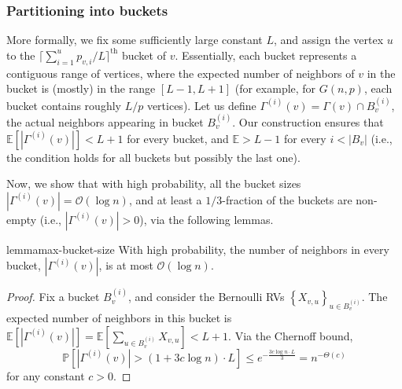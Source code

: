 \subsubsection{Partitioning into buckets}
\label{sec:bucket_partition}
More formally, we fix some sufficiently large constant $L$,
and assign the vertex $u$ to the $\lceil\sum^{u}_{i=1} p_{v,i}/L\rceil^\textrm{th}$ bucket of $v$.
Essentially, each bucket represents a contiguous range of vertices,
where the expected number of neighbors of $v$ in the bucket is (mostly) in the range $[L-1,L+1]$
(for example, for $G(n,p)$, each bucket contains roughly $L/p$ vertices).
Let us define $\Gamma^{(i)}(v) = \Gamma(v) \cap B_v^{(i)}$,
the actual neighbors appearing in bucket $B^{(i)}_v$.
Our construction ensures that $\mathbb E \left[|\Gamma^{(i)}(v)|\right] < L+1$ for every bucket,
and $\mathbb E > L-1$ for every $i < |B_v|$
(i.e., the condition holds for all buckets but possibly the last one).

Now, we show that with high probability, all the bucket sizes $|\Gamma^{(i)}(v)|=\mathcal{O}(\log n)$, and at least a $1/3$-fraction of the buckets are non-empty (i.e., $|\Gamma^{(i)}(v)|>0$), via the following lemmas.

\begin{restatable}{lemma}{max-bucket-size}
\label{lem:max_bucket_size}
With high probability, the number of neighbors in every bucket, $|\Gamma^{(i)}(v)|$, is at most $ \mathcal{O}(\log n)$.
\end{restatable}
\begin{proof}
Fix a bucket $B_v^{(i)}$, and consider the Bernoulli RVs $\left\{ X_{v,u}\right\}_{u\in B_v^{(i)}}$.
The expected number of neighbors in this bucket is
$ \textstyle\mathbb{E} \left[ |\Gamma^{(i)}(v)| \right] =\mathbb{E} \left[ \sum_{u\in B_v^{(i)}} X_{v,u} \right] < L+1$.
Via the Chernoff bound,
$$
\mathbb{P} \left[ |\Gamma^{(i)}(v)|> (1+3c\log n)\cdot L \right]
\le e^{-\frac{3c\log n\cdot L}{3}} = n^{-\Theta(c)}
$$
for any constant $c > 0$.
\end{proof}

